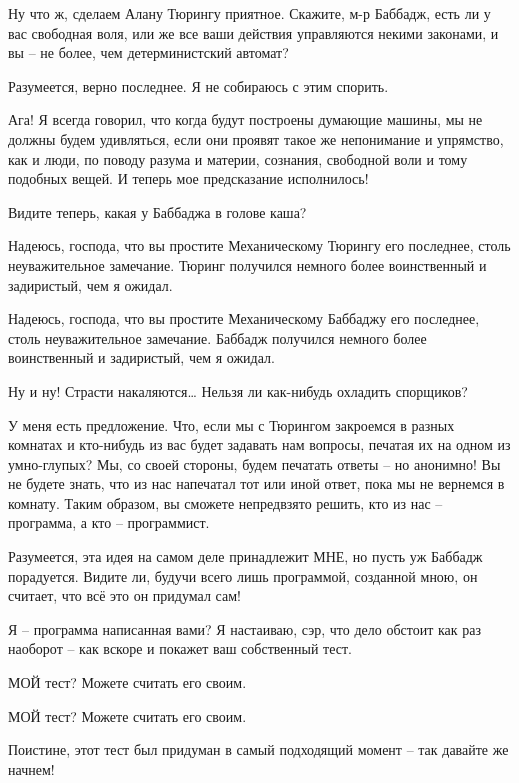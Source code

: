 \documentclass[../main.tex]{subfiles}
\begin{document}
\begin{dialogue}
 Ну что ж, сделаем Алану Тюрингу приятное. Скажите, м-р Баббадж, есть ли у вас свободная воля, или же все ваши действия управляются некими законами, и вы \--- не более, чем детерминистский автомат?

 Разумеется, верно последнее. Я не собираюсь с этим спорить.

 Ага! Я всегда говорил, что когда будут построены думающие машины, мы не должны будем удивляться, если они проявят такое же непонимание и упрямство, как и люди, по поводу разума и материи, сознания, свободной воли и тому подобных вещей. И теперь мое предсказание исполнилось!

 Видите теперь, какая у Баббаджа в голове каша?

 Надеюсь, господа, что вы простите Механическому Тюрингу его последнее, столь неуважительное замечание. Тюринг получился немного более воинственный и задиристый, чем я ожидал.

 Надеюсь, господа, что вы простите Механическому Баббаджу его последнее, столь неуважительное замечание. Баббадж получился немного более воинственный и задиристый, чем я ожидал.

 Ну и ну! Страсти накаляются\ldots{} Нельзя ли как-нибудь охладить спорщиков?

 У меня есть предложение. Что, если мы с Тюрингом закроемся в разных комнатах и кто-нибудь из вас будет задавать нам вопросы, печатая их на одном из умно-глупых? Мы, со своей стороны, будем печатать ответы \--- но анонимно! Вы не будете знать, что из нас напечатал тот или иной ответ, пока мы не вернемся в комнату. Таким образом, вы сможете непредвзято решить, кто из нас \--- программа, а кто \--- программист.

 Разумеется, эта идея на самом деле принадлежит МНЕ, но пусть уж Баббадж порадуется. Видите ли, будучи всего лишь программой, созданной мною, он считает, что всё это он придумал сам!

 Я \--- программа написанная вами? Я настаиваю, сэр, что дело обстоит как раз наоборот \--- как вскоре и покажет ваш собственный тест.

 МОЙ тест? Можете считать его своим.

 МОЙ тест? Можете считать его своим.

 Поистине, этот тест был придуман в самый подходящий момент \--- так давайте же начнем!


\end{dialogue}
\end{document}
